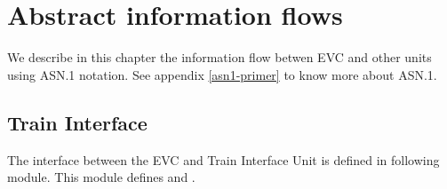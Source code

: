 \chapter{Abstract information flows}
\label{information-flows}

We describe in this chapter the information flow betwen EVC and other
units using ASN.1 notation. See appendix \ref{asn1-primer} to know
more about ASN.1.

\section{Train Interface}

The interface between the EVC and Train Interface Unit is defined in
following  module. This module defines
 and
.


